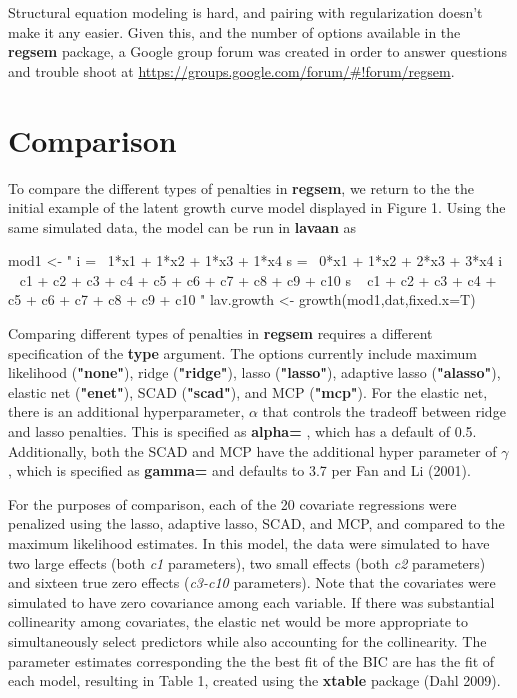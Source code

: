 Structural equation modeling is hard, and pairing with regularization
doesn't make it any easier. Given this, and the number of options
available in the \textbf{regsem} package, a Google group forum was
created in order to answer questions and trouble shoot at
\url{https://groups.google.com/forum/\#!forum/regsem}.

\section{Comparison}\label{comparison}

To compare the different types of penalties in \textbf{regsem}, we
return to the the initial example of the latent growth curve model
displayed in Figure 1. Using the same simulated data, the model can be
run in \textbf{lavaan} as

\begin{Schunk}
\begin{Sinput}
mod1 <- "
i =~ 1*x1 + 1*x2 + 1*x3 + 1*x4
s =~ 0*x1 + 1*x2 + 2*x3 + 3*x4
i ~ c1 + c2 + c3 + c4 + c5 + c6 + c7 + c8 + c9 + c10
s ~ c1 + c2 + c3 + c4 + c5 + c6 + c7 + c8 + c9 + c10
"
lav.growth <- growth(mod1,dat,fixed.x=T)
\end{Sinput}
\end{Schunk}

Comparing different types of penalties in \textbf{regsem} requires a
different specification of the \textbf{type} argument. The options
currently include maximum likelihood (\textbf{"none"}), ridge
(\textbf{"ridge"}), lasso (\textbf{"lasso"}), adaptive lasso
(\textbf{"alasso"}), elastic net (\textbf{"enet"}), SCAD
(\textbf{"scad"}), and MCP (\textbf{"mcp"}). For the elastic net, there
is an additional hyperparameter, \(\alpha\) that controls the tradeoff
between ridge and lasso penalties. This is specified as \textbf{alpha=}
, which has a default of 0.5. Additionally, both the SCAD and MCP have
the additional hyper parameter of \(\gamma\), which is specified as
\textbf{gamma=} and defaults to 3.7 per Fan and Li (2001).

For the purposes of comparison, each of the 20 covariate regressions
were penalized using the lasso, adaptive lasso, SCAD, and MCP, and
compared to the maximum likelihood estimates. In this model, the data
were simulated to have two large effects (both \textit{c1} parameters),
two small effects (both \textit{c2} parameters) and sixteen true zero
effects (\textit{c3-c10} parameters). Note that the covariates were
simulated to have zero covariance among each variable. If there was
substantial collinearity among covariates, the elastic net would be more
appropriate to simultaneously select predictors while also accounting
for the collinearity. The parameter estimates corresponding the the best
fit of the BIC are has the fit of each model, resulting in Table 1,
created using the \textbf{xtable} package (Dahl 2009).

